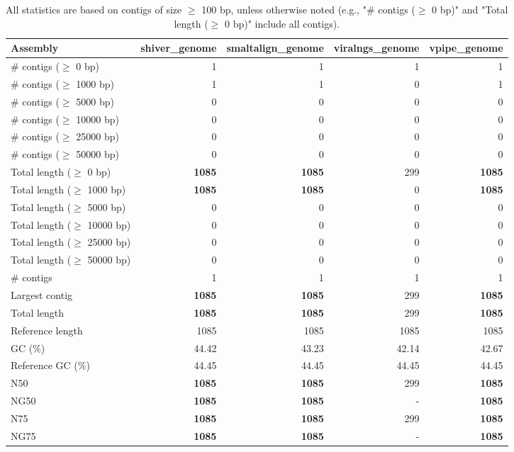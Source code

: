 \documentclass[12pt,a4paper]{article}
\begin{document}
\begin{table}[ht]
\begin{center}
\caption{All statistics are based on contigs of size $\geq$ 100 bp, unless otherwise noted (e.g., "\# contigs ($\geq$ 0 bp)" and "Total length ($\geq$ 0 bp)" include all contigs).}
\begin{tabular}{|l*{4}{|r}|}
\hline
Assembly & shiver\_genome & smaltalign\_genome & viralngs\_genome & vpipe\_genome \\ \hline
\# contigs ($\geq$ 0 bp) & 1 & 1 & 1 & 1 \\ \hline
\# contigs ($\geq$ 1000 bp) & 1 & 1 & 0 & 1 \\ \hline
\# contigs ($\geq$ 5000 bp) & 0 & 0 & 0 & 0 \\ \hline
\# contigs ($\geq$ 10000 bp) & 0 & 0 & 0 & 0 \\ \hline
\# contigs ($\geq$ 25000 bp) & 0 & 0 & 0 & 0 \\ \hline
\# contigs ($\geq$ 50000 bp) & 0 & 0 & 0 & 0 \\ \hline
Total length ($\geq$ 0 bp) & {\bf 1085} & {\bf 1085} & 299 & {\bf 1085} \\ \hline
Total length ($\geq$ 1000 bp) & {\bf 1085} & {\bf 1085} & 0 & {\bf 1085} \\ \hline
Total length ($\geq$ 5000 bp) & 0 & 0 & 0 & 0 \\ \hline
Total length ($\geq$ 10000 bp) & 0 & 0 & 0 & 0 \\ \hline
Total length ($\geq$ 25000 bp) & 0 & 0 & 0 & 0 \\ \hline
Total length ($\geq$ 50000 bp) & 0 & 0 & 0 & 0 \\ \hline
\# contigs & 1 & 1 & 1 & 1 \\ \hline
Largest contig & {\bf 1085} & {\bf 1085} & 299 & {\bf 1085} \\ \hline
Total length & {\bf 1085} & {\bf 1085} & 299 & {\bf 1085} \\ \hline
Reference length & 1085 & 1085 & 1085 & 1085 \\ \hline
GC (\%) & 44.42 & 43.23 & 42.14 & 42.67 \\ \hline
Reference GC (\%) & 44.45 & 44.45 & 44.45 & 44.45 \\ \hline
N50 & {\bf 1085} & {\bf 1085} & 299 & {\bf 1085} \\ \hline
NG50 & {\bf 1085} & {\bf 1085} & - & {\bf 1085} \\ \hline
N75 & {\bf 1085} & {\bf 1085} & 299 & {\bf 1085} \\ \hline
NG75 & {\bf 1085} & {\bf 1085} & - & {\bf 1085} \\ \hline

\end{tabular}
\end{center}
\end{table}
\end{document}
